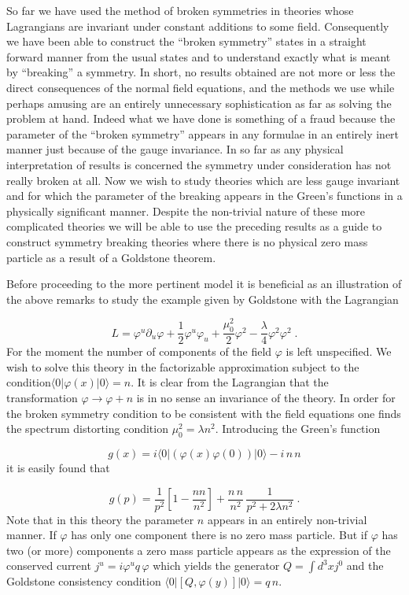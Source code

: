 \documentclass[%
  12pt,
  paper=letter,
  abstracton,
  pagesize=auto,
  version=last,
  DIV=calc
  ]{scrartcl}
\begin{document}
So far we have used the method of broken symmetries in theories whose
Lagrangians are invariant under constant additions to some field.
Consequently we have been able to construct the ``broken symmetry''
states in a straight forward manner from the usual states and to
understand exactly what is meant by ``breaking'' a symmetry.  In short,
no results obtained are not more or less the direct consequences of
the normal field equations, and the methods we use while perhaps
amusing are an entirely unnecessary sophistication as far as solving
the problem at hand.  Indeed what we have done is something of a fraud
because the parameter of the ``broken symmetry'' appears in any formulae
in an entirely inert manner just because of the gauge invariance.  In
so far as any physical interpretation of results is concerned the
symmetry under consideration has not really broken at all.  Now we
wish to study theories which are less gauge invariant and for which
the parameter of the breaking appears in the Green's functions in a
physically significant manner.  Despite the non-trivial nature of
these more complicated theories we will be able to use the preceding
results as a guide to construct symmetry breaking theories where there
is no physical zero mass particle as a result of a Goldstone theorem.

Before proceeding to the more pertinent model it is beneficial as an
illustration of the above remarks to study the example given by
Goldstone \cite{1} with the Lagrangian

\[L=\varphi^u\partial_u\varphi+\frac{1}{2}\varphi^u\varphi_u+\frac{\mu^2_0}{2}\varphi^2-\frac{\lambda}{4}\varphi^2\varphi^2\;.\]
For the moment the number of components of the field $\varphi$ is left
unspecified.  We wish to solve this theory in the factorizable
approximation subject to the condition$\langle 0|\varphi(x)|0\rangle = n$.  It is
clear from the Lagrangian that the transformation $\varphi \rightarrow
\varphi+n$ is in no sense an invariance of the theory.  In order for
the broken symmetry condition to be consistent with the field
equations one finds the spectrum distorting condition $\mu^2_0=\lambda
n^2$.  Introducing the Green's function

\[g(x)=i\langle 0|(\varphi(x)
\varphi(0))|0\rangle -i\, n\, n\]
it is easily found that

\[g(p)=\frac{1}{p^2}[1-\frac{n n}{n^2}] + \frac{n\, n}{n^2}\, \frac{1}{p^2+2\lambda n^2}\;.\]
Note that in this theory the parameter $n$ appears in an entirely
non-trivial manner.  If $\varphi$ has only one component there is no
zero mass particle.  But if $\varphi$ has two (or more) components a
zero mass particle appears as the expression of the conserved current
$j^u=i \varphi^u q\, \varphi$ which yields the generator $Q=\int d^3 x
j^0$ and the Goldstone consistency condition $\langle 0|[Q,
\varphi(y)]|0\rangle = q\, n$.
\end{document}

